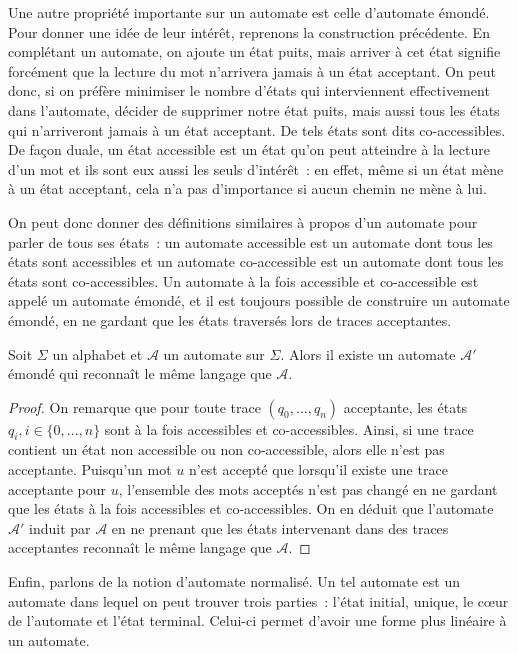 Une autre propriété importante sur un automate est celle d'automate émondé.
Pour donner une idée de leur intérêt, reprenons la construction précédente.
En complétant un automate, on ajoute un état puits, mais arriver à cet état
signifie forcément que la lecture du mot n'arrivera jamais à un état acceptant.
On peut donc, si on préfère minimiser le nombre d'états qui interviennent
effectivement dans l'automate, décider de supprimer notre état puits, mais aussi
tous les états qui n'arriveront jamais à un état acceptant. De tels états sont
dits co-accessibles. De façon duale, un état accessible est un état qu'on peut
atteindre à la lecture d'un mot et ils sont eux aussi les seuls d'intérêt~:
en effet, même si un état mène à un état acceptant, cela n'a pas d'importance
si aucun chemin ne mène à lui.

On peut donc donner des définitions similaires à propos d'un automate pour
parler de tous ses états~: un automate accessible est un automate dont tous les
états sont accessibles et un automate co-accessible est un automate dont tous
les états sont co-accessibles. Un automate à la fois accessible et co-accessible
est appelé un automate émondé, et il est toujours possible de construire un
automate émondé, en ne gardant que les états traversés lors de traces
acceptantes.

\begin{proposition}
  Soit $\Sigma$ un alphabet et $\mathcal A$ un automate sur $\Sigma$. Alors
  il existe un automate $\mathcal A'$ émondé qui reconnaît le même langage que
  $\mathcal A$.
\end{proposition}

\begin{proof}
  On remarque que pour toute trace $(q_0,\ldots,q_n)$ acceptante, les états
  $q_i, i \in \{0,\ldots,n\}$ sont à la fois accessibles et co-accessibles.
  Ainsi, si une trace contient un état non accessible ou non co-accessible,
  alors elle n'est pas acceptante. Puisqu'un mot $u$ n'est accepté que lorsqu'il
  existe une trace acceptante pour $u$, l'ensemble des mots acceptés n'est pas
  changé en ne gardant que les états à la fois accessibles et co-accessibles. On
  en déduit que l'automate $\mathcal A'$ induit par $\mathcal A$ en ne prenant
  que les états intervenant dans des traces acceptantes reconnaît le même
  langage que $\mathcal A$.
\end{proof}

Enfin, parlons de la notion d'automate normalisé. Un tel automate est un
automate dans lequel on peut trouver trois parties~: l'état initial,
unique, le c\oe ur de l'automate et l'état terminal. Celui-ci permet d'avoir
une forme plus linéaire à un automate.

